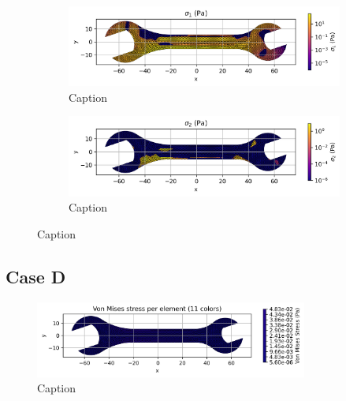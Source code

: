     \begin{figure}[H]
        \centering
        \begin{subfigure}[t]{0.49\textwidth}
        \centering
        \includegraphics[width=\textwidth]{GRAFICOS/Case c - sigma_1_per_element.png}
        \caption{Caption}
        \label{fig:deformada_reacciones}
        \end{subfigure}
        \hfill
        \begin{subfigure}[t]{0.49\textwidth}
        \centering
        \includegraphics[width=\textwidth]{GRAFICOS/Case c - sigma_2_per_element.png}
        \caption{Caption}
        \label{fig:von_mises}
        \end{subfigure}
        \caption{Caption}
        \label{fig:analisis_estructural}
    \end{figure}

\subsection{Case D}

\begin{figure}[H]
    \centering
    \includegraphics[width=0.8\textwidth]{GRAFICOS/Case d_von_mises_per_element_11_colors.png}
    \caption{Caption}
    \label{fig:strain}
  \end{figure}

